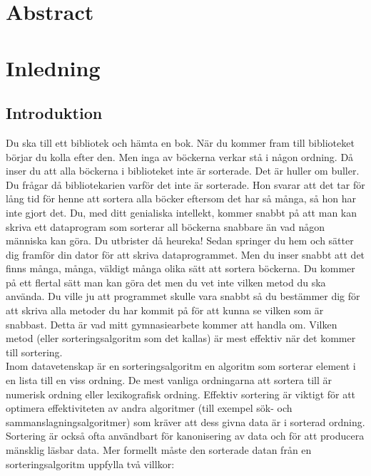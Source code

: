 \documentclass[a4]{article}
\begin{document}
\onecolumn
\pagestyle{fancy}
\fancyhf{}
\cfoot{\thepage}


\section*{Abstract}
\blindtext

\newpage
{}
\tableofcontents

\newpage
{}

\section{Inledning}

\subsection{Introduktion}
Du ska till ett bibliotek och hämta en bok. När du kommer fram till biblioteket börjar du kolla efter den. Men inga av böckerna verkar stå i någon ordning. Då inser du att alla böckerna i biblioteket inte är sorterade. Det är huller om buller. Du frågar då bibliotekarien varför det inte är sorterade. Hon svarar att det tar för lång tid för henne att sortera alla böcker eftersom det har så många, så hon har inte gjort det. Du, med ditt genialiska intellekt, kommer snabbt på att man kan skriva ett dataprogram som sorterar all böckerna snabbare än vad någon människa kan göra. Du utbrister då heureka! Sedan springer du hem och sätter dig framför din dator för att skriva dataprogrammet. Men du inser snabbt att det finns många, många, väldigt många olika sätt att sortera böckerna. Du kommer på ett flertal sätt man kan göra det men du vet inte vilken metod du ska använda. Du ville ju att programmet skulle vara snabbt så du bestämmer dig för att skriva alla metoder du har kommit på för att kunna se vilken som är snabbast. Detta är vad mitt gymnasiearbete kommer att handla om. Vilken metod (eller sorteringsalgoritm som det kallas) är mest effektiv när det kommer till sortering.\\
Inom datavetenskap är en sorteringsalgoritm en algoritm som sorterar element i en lista till en viss ordning. De mest vanliga ordningarna att sortera till är numerisk ordning eller lexikografisk ordning. Effektiv sortering är viktigt för att optimera effektiviteten av andra algoritmer (till exempel sök- och sammanslagningsalgoritmer) som kräver att dess givna data är i sorterad ordning. Sortering är också ofta användbart för kanonisering av data och för att producera mänsklig läsbar data. Mer formellt måste den sorterade datan från en sorteringsalgoritm uppfylla två villkor:\cite{1, 2}
\end{document}
